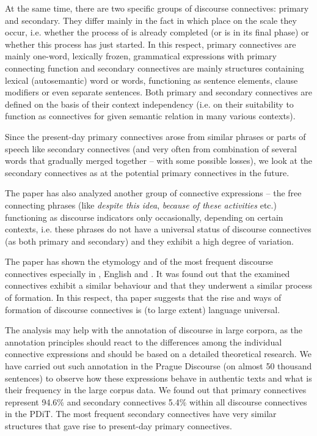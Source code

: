 \documentclass[output=paper]{langsci/langscibook.cls}
\begin{document}
At the same time, there are two specific groups of discourse connectives: primary and secondary. They differ mainly in the fact in which place on the scale they occur, i.e. whether the process of  is already completed (or is in its final phase) or whether this process has just started. In this respect, primary connectives are mainly one-word, lexically frozen, grammatical expressions with primary connecting function and secondary connectives are mainly  structures containing lexical (autosemantic) word or words, functioning as sentence elements, clause modifiers or even separate sentences. Both primary and secondary connectives are defined on the basis of their context independency (i.e. on their suitability to function as connectives for given semantic relation in many various contexts).


Since the present-day primary connectives arose from similar phrases or parts of speech like secondary connectives (and very often from combination of several words that gradually merged together -- with some possible losses), we look at the secondary connectives as at the potential primary connectives in the future. 

The paper has also analyzed another group of connective expressions – the free connecting phrases (like \textit{despite this idea}, \textit{because of these activities} etc.) functioning as discourse indicators only occasionally, depending on certain contexts, i.e. these phrases do not have a universal status of discourse connectives (as both primary and secondary) and they exhibit a high degree of variation.

The paper has shown the etymology and  of the most frequent discourse connectives especially in , English and . It was found out that the examined connectives exhibit a similar behaviour and that they underwent a similar process of formation. In this respect, tha paper suggests that the rise and ways of formation of discourse connectives is (to large extent) language universal. 

The analysis may help with the annotation of discourse in large corpora, as the annotation principles should react to the differences among the individual connective expressions and should be based on a detailed theoretical research. We have carried out such annotation in the Prague Discourse  (on almost 50 thousand sentences) to observe how these expressions behave in authentic texts and what is their frequency in the large corpus data. We found out that primary connectives represent 94.6\% and secondary connectives 5.4\% within all discourse connectives in the PDiT. The most frequent secondary connectives have very similar structures that gave rise to present-day primary connectives.
\end{document}

